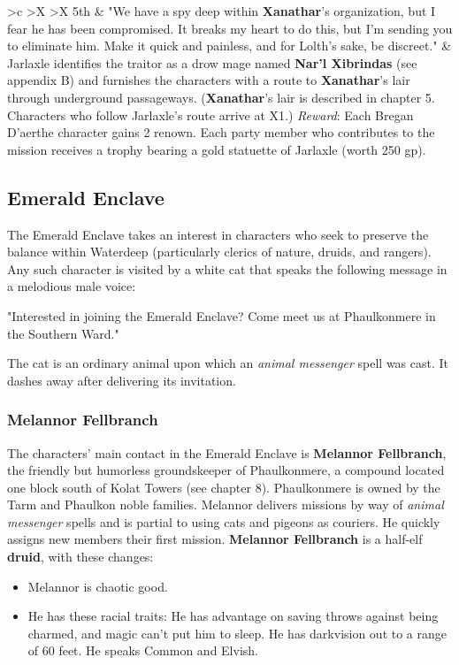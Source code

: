 \documentclass[10pt,a4paper,twoside,twocolumn,openany,nodeprecatedcode]{dndbook}
\begin{document}
\begin{DndTable}{>{\hsize}c >{\hsize}X >{\hsize}X}
5th & "We have a spy deep within \textbf{Xanathar}'s organization, but I fear he has been compromised. It breaks my heart to do this, but I'm sending you to eliminate him. Make it quick and painless, and for Lolth's sake, be discreet." & Jarlaxle identifies the traitor as a drow mage named \textbf{Nar'l Xibrindas} (see appendix B) and furnishes the characters with a route to \textbf{Xanathar}'s lair through underground passageways. (\textbf{Xanathar}'s lair is described in chapter 5. Characters who follow Jarlaxle's route arrive at X1.) \textit{Reward}: Each Bregan D'aerthe character gains 2 renown. Each party member who contributes to the mission receives a trophy bearing a gold statuette of Jarlaxle (worth 250 gp).\\
\end{DndTable}


\subsection{Emerald Enclave}
The Emerald Enclave takes an interest in characters who seek to preserve the balance within Waterdeep (particularly clerics of nature, druids, and rangers). Any such character is visited by a white cat that speaks the following message in a melodious male voice:
\begin{DndReadAloud}{}
"Interested in joining the Emerald Enclave? Come meet us at Phaulkonmere in the Southern Ward."
\end{DndReadAloud}

The cat is an ordinary animal upon which an \textit{animal messenger} spell was cast. It dashes away after delivering its invitation.
\subsubsection{Melannor Fellbranch}
The characters' main contact in the Emerald Enclave is \textbf{Melannor Fellbranch}, the friendly but humorless groundskeeper of Phaulkonmere, a compound located one block south of Kolat Towers (see chapter 8). Phaulkonmere is owned by the Tarm and Phaulkon noble families. Melannor delivers missions by way of \textit{animal messenger} spells and is partial to using cats and pigeons as couriers. He quickly assigns new members their first mission.
\textbf{Melannor Fellbranch} is a half-elf \textbf{druid}, with these changes:
\begin{itemize}

\item Melannor is chaotic good.
\item He has these racial traits: He has advantage on saving throws against being charmed, and magic can't put him to sleep. He has darkvision out to a range of 60 feet. He speaks Common and Elvish.
\end{itemize}
\end{document}
